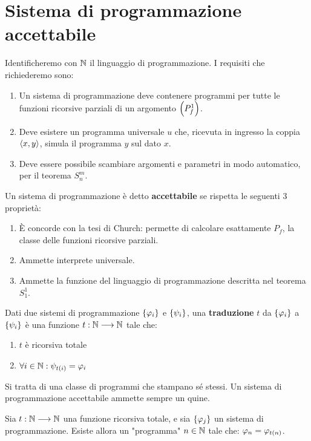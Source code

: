 \documentclass{lectures}
\begin{document}
\chapter{Sistema di programmazione accettabile}

\begin{multicols}{2}
    \begin{observation}
        Identificheremo con \(\mathbb{N}\) il linguaggio di programmazione. I requisiti che richiederemo sono:
        \begin{enumerate}
            \item Un sistema di programmazione deve contenere programmi per tutte le funzioni ricorsive parziali di un argomento \(\left(P^1_f\right)\).
            \item Deve esistere un programma universale \(u\) che, ricevuta in ingresso la coppia \(\left\langle x,y\right\rangle\), simula il programma \(y\) sul dato \(x\).
            \item Deve essere possibile scambiare argomenti e parametri in modo automatico, per il teorema \(S^m_n\).
        \end{enumerate}
    \end{observation}
    \begin{definition}
        Un sistema di programmazione è detto \textbf{accettabile} se rispetta le seguenti 3 proprietà:
        \begin{enumerate}
            \item È concorde con la tesi di Church: permette di calcolare esattamente \(P_f\), la classe delle funzioni ricorsive parziali.
            \item Ammette interprete universale.
            \item Ammette la funzione del linguaggio di programmazione descritta nel teorema \(S^1_1\).
        \end{enumerate}
    \end{definition}
    \begin{definition}[Traduzione]
        Dati due sistemi di programmazione \(\left\{\varphi_i\right\}\) e \(\left\{\psi_i\right\}\), una \textbf{traduzione} \(t\) da \(\left\{\varphi_i\right\}\) a \(\left\{\psi_i\right\}\) è una funzione \(t:\mathbb{N}\longrightarrow \mathbb{N}\) tale che:
        \begin{enumerate}
            \item \(t\) è ricorsiva totale
            \item \(\forall i\in\mathbb{N}: \psi_{t\left(i\right)}=\varphi_i\)
        \end{enumerate}
    \end{definition}
    \begin{definition}[Quines]
        Si tratta di una classe di programmi che stampano sé stessi. Un sistema di programmazione accettabile ammette sempre un quine.
    \end{definition}
    \begin{theorem}
        Sia \(t:\mathbb{N}\longrightarrow \mathbb{N}\) una funzione ricorsiva totale, e sia \(\left\{\varphi_j\right\}\) un sistema di programmazione. Esiste allora un "programma" \(n \in \mathbb{N}\) tale che: \(\varphi_n = \varphi_{t\left(n\right)}\).
        

\end{theorem}
\end{multicols}
\end{document}

